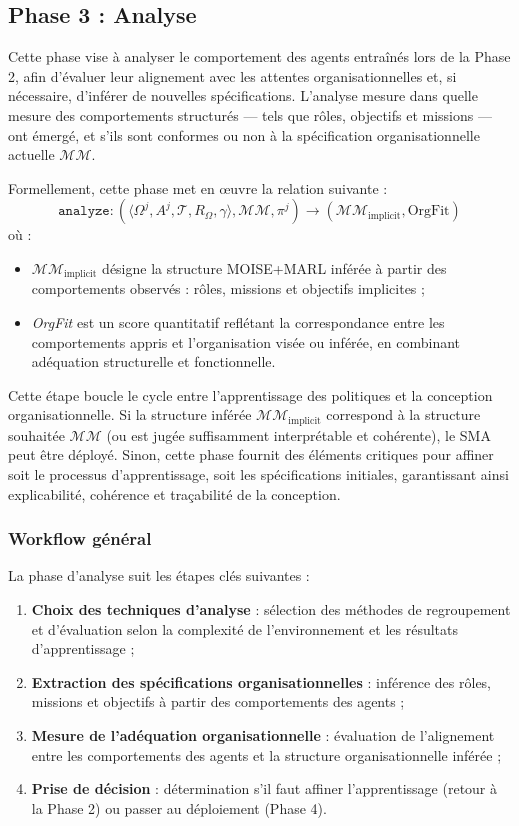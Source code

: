 \documentclass[pdflatex,sn-mathphys-num]{sn-jnl}%
\theoremstyle{thmstyleone}%
\theoremstyle{thmstyletwo}%
\theoremstyle{thmstylethree}%
\begin{document}
\subsection{Phase 3 : Analyse}

Cette phase vise à analyser le comportement des agents entraînés lors de la Phase 2, afin d'évaluer leur alignement avec les attentes organisationnelles et, si nécessaire, d'inférer de nouvelles spécifications. L'analyse mesure dans quelle mesure des comportements structurés — tels que rôles, objectifs et missions — ont émergé, et s'ils sont conformes ou non à la spécification organisationnelle actuelle $\mathcal{MM}$.

Formellement, cette phase met en œuvre la relation suivante :
\[
    \texttt{analyze}: \left( \langle \Omega^j, A^j, \mathcal{T}, R_{\Omega}, \gamma \rangle, \mathcal{MM}, \pi^j \right) \longrightarrow (\mathcal{MM}_{\text{implicit}}, \text{OrgFit})
\]
où :
\begin{itemize}
    \item $\mathcal{MM}_{\text{implicit}}$ désigne la structure MOISE+MARL inférée à partir des comportements observés : rôles, missions et objectifs implicites ;
    \item \textit{OrgFit} est un score quantitatif reflétant la correspondance entre les comportements appris et l'organisation visée ou inférée, en combinant adéquation structurelle et fonctionnelle.
\end{itemize}

Cette étape boucle le cycle entre l'apprentissage des politiques et la conception organisationnelle. Si la structure inférée $\mathcal{MM}_{\text{implicit}}$ correspond à la structure souhaitée $\mathcal{MM}$ (ou est jugée suffisamment interprétable et cohérente), le SMA peut être déployé. Sinon, cette phase fournit des éléments critiques pour affiner soit le processus d'apprentissage, soit les spécifications initiales, garantissant ainsi explicabilité, cohérence et traçabilité de la conception.

\subsubsection{Workflow général}

La phase d'analyse suit les étapes clés suivantes :
\begin{enumerate}
    \item \textbf{Choix des techniques d'analyse} : sélection des méthodes de regroupement et d'évaluation selon la complexité de l'environnement et les résultats d'apprentissage ;
    \item \textbf{Extraction des spécifications organisationnelles} : inférence des rôles, missions et objectifs à partir des comportements des agents ;
    \item \textbf{Mesure de l'adéquation organisationnelle} : évaluation de l'alignement entre les comportements des agents et la structure organisationnelle inférée ;
    \item \textbf{Prise de décision} : détermination s'il faut affiner l'apprentissage (retour à la Phase 2) ou passer au déploiement (Phase 4).
\end{enumerate}
\end{document}
